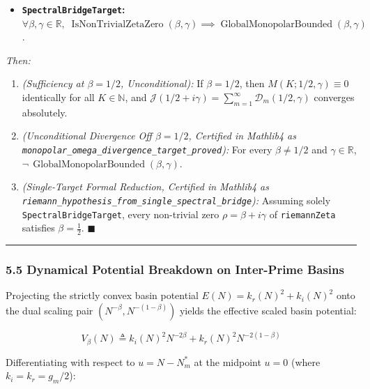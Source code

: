 \documentclass[
  11pt,
]{article}
\providecommand{\tightlist}{%
  \setlength{\itemsep}{0pt}\setlength{\parskip}{0pt}}
\begin{document}
\begin{itemize}
\tightlist
\item
  \textbf{\texttt{SpectralBridgeTarget}:}
  \(\forall \beta, \gamma \in \mathbb{R},\; \operatorname{IsNonTrivialZetaZero}(\beta, \gamma) \implies \operatorname{GlobalMonopolarBounded}(\beta, \gamma)\).
\end{itemize}

\emph{Then:}

\begin{enumerate}
\def\labelenumi{\arabic{enumi}.}
\tightlist
\item
  \emph{(Sufficiency at \(\beta = 1/2\), Unconditional):} If
  \(\beta = 1/2\), then \(M(K; 1/2, \gamma) \equiv 0\) identically for
  all \(K \in \mathbb{N}\), and
  \(\mathcal{J}(1/2 + i\gamma) = \sum_{m=1}^\infty \mathcal{D}_m(1/2, \gamma)\)
  converges absolutely.
\item
  \emph{(Unconditional Divergence Off \(\beta = 1/2\), Certified in
  Mathlib4 as \texttt{monopolar\_omega\_divergence\_target\_proved}):}
  For every \(\beta \neq 1/2\) and \(\gamma \in \mathbb{R}\),
  \(\neg\,\operatorname{GlobalMonopolarBounded}(\beta, \gamma)\).
\item
  \emph{(Single-Target Formal Reduction, Certified in Mathlib4 as
  \texttt{riemann\_hypothesis\_from\_single\_spectral\_bridge}):}
  Assuming solely \texttt{SpectralBridgeTarget}, every non-trivial zero
  \(\rho = \beta + i\gamma\) of \texttt{riemannZeta} satisfies
  \(\beta = \frac{1}{2}\). \(\blacksquare\)
\end{enumerate}

\begin{center}\rule{0.5\linewidth}{0.5pt}\end{center}

\subsubsection{5.5 Dynamical Potential Breakdown on Inter-Prime
Basins}\label{dynamical-potential-breakdown-on-inter-prime-basins}

Projecting the strictly convex basin potential
\(E(N) = k_r(N)^2 + k_i(N)^2\) onto the dual scaling pair
\((N^{-\beta}, N^{-(1-\beta)})\) yields the effective scaled basin
potential:

\[V_{\beta}(N) \triangleq k_i(N)^2 N^{-2\beta} + k_r(N)^2 N^{-2(1-\beta)}\]

Differentiating with respect to \(u = N - N_m^*\) at the midpoint
\(u = 0\) (where \(k_i = k_r = g_m/2\)):
\end{document}
